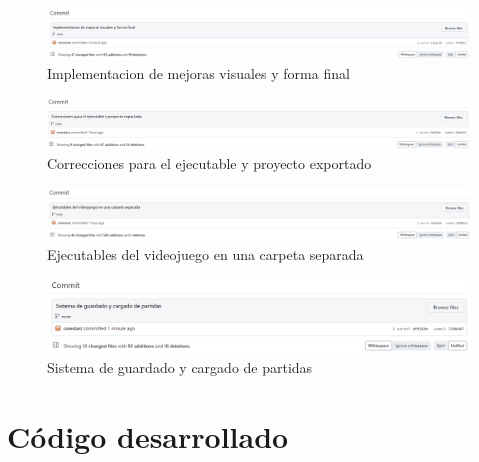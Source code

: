 \documentclass{article}
\begin{document}
\begin{figure}[H]
	\centering
	\includegraphics[width=1\textwidth,keepaspectratio]{img/commit_30.png}
	\caption{Implementacion de mejoras visuales y forma final}
\end{figure}
\begin{figure}[H]
	\centering
	\includegraphics[width=1\textwidth,keepaspectratio]{img/commit_31.png}
	\caption{Correcciones para el ejecutable y proyecto exportado}
\end{figure}
\begin{figure}[H]
	\centering
	\includegraphics[width=1\textwidth,keepaspectratio]{img/commit_32.png}
	\caption{Ejecutables del videojuego en una carpeta separada}
\end{figure}
\begin{figure}[H]
	\centering
	\includegraphics[width=1\textwidth,keepaspectratio]{img/commit_33.png}
	\caption{Sistema de guardado y cargado de partidas}
\end{figure}
\pagebreak

\section{Código desarrollado}
\end{document}
